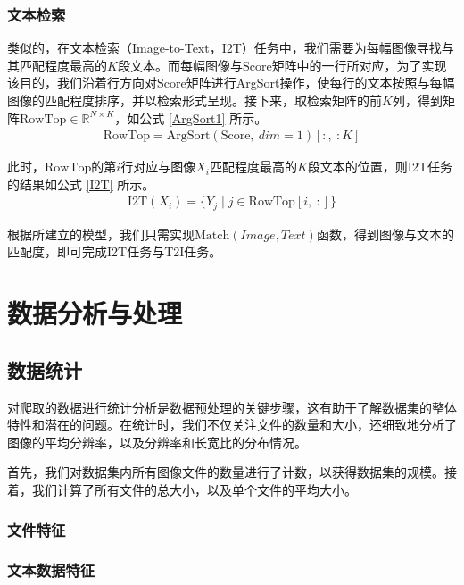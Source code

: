 \documentclass[a4paper]{zreport}
\begin{document}
\subsubsection{文本检索}

类似的，在文本检索（Image-to-Text，I2T）任务中，我们需要为每幅图像寻找与其匹配程度最高的$K$段文本。而每幅图像与$\mathrm{Score}$矩阵中的一行所对应，为了实现该目的，我们沿着行方向对$\mathrm{Score}$矩阵进行ArgSort操作，使每行的文本按照与每幅图像的匹配程度排序，并以检索形式呈现。接下来，取检索矩阵的前$K$列，得到矩阵$\mathrm{RowTop} \in \mathbb{R}^{N \times K}$，如公式 \eqref{ArgSort1} 所示。
\begin{gather}
\mathrm{RowTop} = \mathrm{ArgSort}\left(\mathrm{Score},~dim=1\right)\left[:,~:K\right]
\label{ArgSort1}
\end{gather}

此时，$\mathrm{RowTop}$的第$i$行对应与图像$X_i$匹配程度最高的$K$段文本的位置，则I2T任务的结果如公式 \eqref{I2T} 所示。
\begin{gather}
\mathrm{I2T}\left(X_i\right) = \{Y_j\mid j \in \mathrm{RowTop}\left[i,~:\right]\}\label{I2T}
\end{gather}


根据所建立的模型，我们只需实现$\mathrm{Match}\left(Image, Text\right)$函数，得到图像与文本的匹配度，即可完成I2T任务与T2I任务。


\section{数据分析与处理}

\subsection{数据统计}

对爬取的数据进行统计分析是数据预处理的关键步骤，这有助于了解数据集的整体特性和潜在的问题。在统计时，我们不仅关注文件的数量和大小，还细致地分析了图像的平均分辨率，以及分辨率和长宽比的分布情况。

首先，我们对数据集内所有图像文件的数量进行了计数，以获得数据集的规模。接着，我们计算了所有文件的总大小，以及单个文件的平均大小。

\subsubsection{文件特征}

\subsubsection{文本数据特征}
\end{document}
